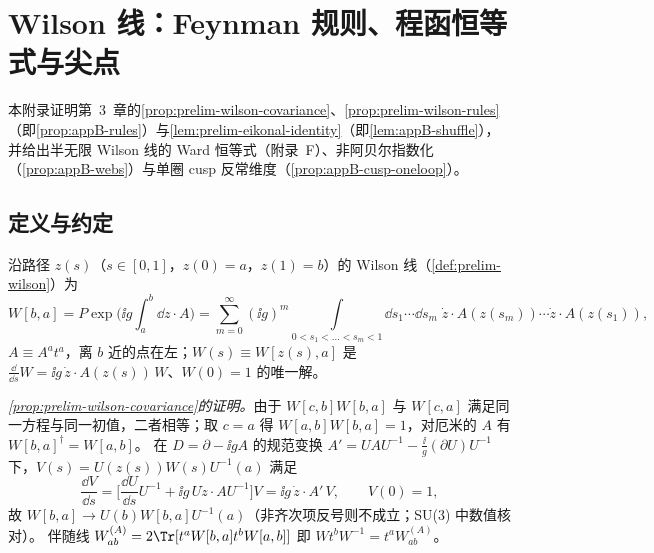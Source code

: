 \chapter{Wilson 线：Feynman 规则、程函恒等式与尖点}\label{app:appB}

本附录证明第~3~章的\cref{prop:prelim-wilson-covariance}、\cref{prop:prelim-wilson-rules}（即\cref{prop:appB-rules}）与\cref{lem:prelim-eikonal-identity}（即\cref{lem:appB-shuffle}），
并给出半无限 Wilson 线的 Ward 恒等式（附录~F）、非阿贝尔指数化（\cref{prop:appB-webs}）与单圈 cusp 反常维度（\cref{prop:appB-cusp-oneloop}）。

\section{定义与约定}\label{sec:appB-definition}

沿路径 $z(s)$（$s\in[0,1]$，$z(0)=a$，$z(1)=b$）的 Wilson 线（\cref{def:prelim-wilson}）为
\begin{equation}\label{eq:appB-W}
W[b,a]=P\exp\Big(\ii g\int_a^b\dd z\cdot A\Big)=\sum_{m=0}^\infty(\ii g)^m\!\!\int\limits_{0<s_1<\dots<s_m<1}\!\!\dd s_1\cdots\dd s_m\;
\dot z\cdot A(z(s_m))\cdots\dot z\cdot A(z(s_1)),
\end{equation}
$A\equiv A^at^a$，离 $b$ 近的点在左；$W(s)\equiv W[z(s),a]$ 是 $\frac{\dd}{\dd s}W=\ii g\,\dot z\cdot A(z(s))\,W$、$W(0)=1$ 的唯一解。

\emph{\cref{prop:prelim-wilson-covariance}的证明。}由于 $W[c,b]W[b,a]$ 与 $W[c,a]$ 满足同一方程与同一初值，二者相等；取 $c=a$ 得 $W[a,b]W[b,a]=1$，对厄米的 $A$ 有 $W[b,a]^\dagger=W[a,b]$。
在 $D=\partial-\ii gA$ 的规范变换 $A'=UAU^{-1}-\frac{\ii}g(\partial U)U^{-1}$ 下，$V(s)=U(z(s))W(s)U^{-1}(a)$ 满足
\[
\frac{\dd V}{\dd s}=\Big[\frac{\dd U}{\dd s}U^{-1}+\ii g\,U\dot z\cdot AU^{-1}\Big]V=\ii g\,\dot z\cdot A'\,V,\qquad V(0)=1,
\]
故 $W[b,a]\to U(b)W[b,a]U^{-1}(a)$（非齐次项反号则不成立；SU(3) 中数值核对）。%
伴随线 $W^{(A)}_{ab}=2\Tr[t^aW[b,a]t^bW[a,b]]$ 即 $W t^bW^{-1}=t^aW^{(A)}_{ab}$。

